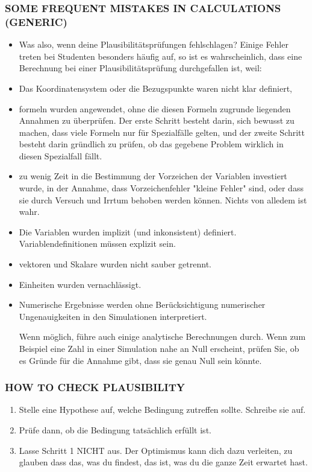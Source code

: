 \subsubsection{SOME FREQUENT MISTAKES IN CALCULATIONS (GENERIC)}
\begin{itemize}
    \item Was also, wenn deine Plausibilitätsprüfungen fehlschlagen? Einige Fehler treten bei Studenten besonders häufig auf, so ist es wahrscheinlich, dass eine Berechnung bei einer Plausibilitätsprüfung durchgefallen ist, weil: 
    \item Das Koordinatensystem oder die Bezugspunkte waren nicht klar definiert,
    \item formeln wurden angewendet, ohne die diesen Formeln zugrunde liegenden Annahmen zu überprüfen. Der erste Schritt besteht darin, sich bewusst zu machen, dass viele Formeln nur für Spezialfälle gelten, und der zweite Schritt besteht darin gründlich zu prüfen, ob das gegebene Problem wirklich in diesen Spezialfall fällt.
    \item zu wenig Zeit in die Bestimmung der Vorzeichen der Variablen investiert wurde, in der Annahme, dass Vorzeichenfehler 
"kleine Fehler" sind, oder dass sie durch Versuch und Irrtum behoben werden können. Nichts von alledem ist wahr. 
    \item Die Variablen wurden implizit (und inkonsistent) definiert. Variablendefinitionen müssen explizit sein. 
    \item vektoren und Skalare wurden nicht sauber getrennt. 
    \item Einheiten wurden vernachlässigt. 
        \item Numerische Ergebnisse werden ohne Berücksichtigung numerischer Ungenauigkeiten in den Simulationen interpretiert. 

        
Wenn möglich, führe auch einige analytische Berechnungen durch. Wenn zum Beispiel eine Zahl in einer Simulation nahe an  Null erscheint, prüfen Sie, ob es Gründe für die Annahme gibt, dass sie genau Null sein könnte.
\end{itemize}


\subsubsection{HOW TO CHECK PLAUSIBILITY}
\begin{enumerate}
    \item Stelle eine Hypothese auf, welche Bedingung zutreffen sollte. Schreibe  sie auf. 
    \item Prüfe dann, ob die Bedingung tatsächlich erfüllt ist. 
    \item Lasse Schritt 1 NICHT aus. Der Optimismus kann dich dazu verleiten, zu glauben dass das, was du findest, das ist, was du die ganze Zeit erwartet hast.
\end{enumerate}

